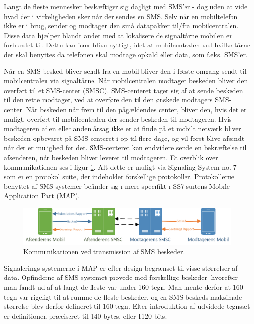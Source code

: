 Langt de fleste mennesker beskæftiger sig dagligt med SMS'er - dog uden at vide hvad der i virkeligheden sker når der sendes en SMS. Selv når en mobiltelefon ikke er i brug, sender og modtager den små datapakker til/fra mobilcentralen. Disse data hjælper blandt andet med at lokalisere de signaltårne mobilen er forbundet til. Dette kan især blive nyttigt, idet at mobilcentralen ved hvilke tårne der skal benyttes da telefonen skal modtage opkald eller data, som f.eks. SMS'er.

Når en SMS besked bliver sendt fra en mobil bliver den i første omgang sendt til mobilcentralen via signaltårne. Når mobilcentralen modtager beskeden bliver den overført til et SMS-center (SMSC). SMS-centeret tager sig af at sende beskeden til den rette modtager, ved at overføre den til den ønskede modtagers SMS-center. Når beskeden når frem til den pågældendes center, bliver den, hvis det er muligt, overført til mobilcentralen der sender beskeden til modtageren. Hvis modtageren af en eller anden årsag ikke er at finde på et mobilt netværk bliver beskeden opbevaret på SMS-centeret i op til flere dage, og vil først blive afsendt når der er mulighed for det. SMS-centeret kan endvidere sende en bekræftelse til afsenderen, når beskeden bliver leveret til modtageren. Et overblik over kommunikationen ses i figur \ref{smsTransm}. Alt dette er muligt via Signaling System no. 7 - som er en protokol suite, der indeholder forskellige protokoller. Protokollerne benyttet af SMS systemer befinder sig i mere specifikt i SS7 suitens Mobile Application Part (MAP). \cite{Pro_1} \cite{sms_max1}

\noindent
\begin{figure}[hba]
\includegraphics[width=\linewidth]{Billeder/Mobil.png}
\caption {Kommunikationen ved transmission af SMS beskeder.}
\label{smsTransm}
\end{figure}

Signalerings systemerne i MAP er efter design begrænset til visse størrelser af data. Opfinderne af SMS systemet prøvede med forskellige beskeder, hvorefter man fandt ud af at langt de fleste var under 160 tegn. Man mente derfor at 160 tegn var rigeligt til at rumme de fleste beskeder, og en SMS beskeds maksimale størrelse blev derfor defineret til 160 tegn. Efter introduktion af udvidede tegnsæt er definitionen præciseret til 140 bytes, eller 1120 bits. \cite{sms_max1} \cite{sms_max2}


